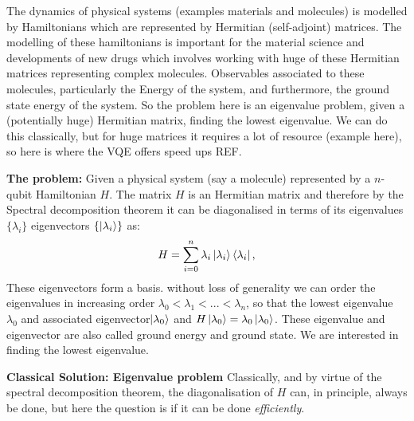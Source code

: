 
The dynamics of physical systems (examples materials and molecules) is modelled by Hamiltonians which are represented by Hermitian (self-adjoint) matrices. The modelling of these hamiltonians is important for the material science and developments of new drugs which involves working with huge of these Hermitian matrices representing complex molecules. Observables associated to these molecules, particularly the Energy of the system, and furthermore, the ground state energy of the system. So the problem here is an eigenvalue problem, given a (potentially huge) Hermitian matrix, finding the lowest eigenvalue. We can do this classically, but for huge matrices it requires a lot of resource (example here), so here is where the VQE offers speed ups REF.

\begin{tcolorbox}[standard jigsaw,
    opacityback=0,  %
    boxrule=0.5pt,label={VQEbox}]
    {\bf The problem:}
    \tcbline
    Given a physical system (say a molecule) represented by a $n$-qubit Hamiltonian $H$. The matrix $H$ is an Hermitian matrix and therefore by the Spectral decomposition theorem it can be diagonalised in terms of its eigenvalues $\{\lambda_i\}$ eigenvectors $\{\left\vert{\lambda_i}\right\rangle\}$ as:
    \begin{align}H=\sum^n_{i=0} \lambda_i \left\vert{\lambda_i}\right\rangle \left\langle{\lambda_i}\right\vert,
    \end{align}
    These eigenvectors form a basis. without loss of generality we can order the eigenvalues in increasing order $\lambda_0<\lambda_1<...<\lambda_n$, so that the lowest eigenvalue $\lambda_0$ and associated eigenvector$\left\vert{\lambda_0}\right\rangle$ and $H \left\vert{\lambda_0}\right\rangle=\lambda_0 \left\vert{\lambda_0}\right\rangle$. These eigenvalue and eigenvector are also called ground energy and ground state. We are interested in finding the lowest eigenvalue. 
\end{tcolorbox}


\begin{tcolorbox}[standard jigsaw,
    opacityback=0,  %
    boxrule=0.5pt,label={VQEbox}]
    {\bf Classical Solution: Eigenvalue problem}
    \tcbline
    Classically, and by virtue of the spectral decomposition theorem, the diagonalisation of $H$ can, in principle, always be done, but here the question is if it can be done \emph{efficiently}.
\end{tcolorbox}

